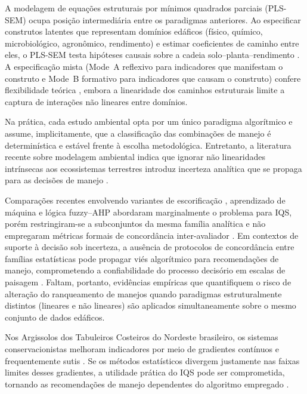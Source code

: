 \documentclass[pdflatex,sn-basic]{sn-jnl}%
\begin{document}
A modelagem de equações estruturais por mínimos quadrados parciais (PLS-SEM) ocupa posição intermediária entre os paradigmas anteriores. Ao especificar construtos latentes que representam domínios edáficos (físico, químico, microbiológico, agronômico, rendimento) e estimar coeficientes de caminho entre eles, o PLS-SEM testa hipóteses causais sobre a cadeia solo--planta--rendimento \citep{Hair2019,Sarstedt2022}. A especificação mista (Mode~A reflexivo para indicadores que manifestam o construto e Mode~B formativo para indicadores que causam o construto) confere flexibilidade teórica \citep{Diamantopoulos2008}, embora a linearidade dos caminhos estruturais limite a captura de interações não lineares entre domínios.

Na prática, cada estudo ambiental opta por um único paradigma algorítmico e assume, implicitamente, que a classificação das combinações de manejo é determinística e estável frente à escolha metodológica. Entretanto, a literatura recente sobre modelagem ambiental indica que ignorar não linearidades intrínsecas aos ecossistemas terrestres introduz incerteza analítica que se propaga para as decisões de manejo \citep{Yoshioka2024,Brito2024,Granata2024}.

Comparações recentes envolvendo variantes de escorificação \citep{Mukherjee2014}, aprendizado de máquina \citep{Zeraatpisheh2020} e lógica fuzzy--AHP \citep{Pacci2026} abordaram marginalmente o problema para IQS, porém restringiram-se a subconjuntos da mesma família analítica e não empregaram métricas formais de concordância inter-avaliador \citep{Venkateswarlu2025,Liu2025}. Em contextos de suporte à decisão sob incerteza, a ausência de protocolos de concordância entre famílias estatísticas pode propagar viés algorítmico para recomendações de manejo, comprometendo a confiabilidade do processo decisório em escalas de paisagem \citep{Angelini2024,Jarvis2023}. Faltam, portanto, evidências empíricas que quantifiquem o risco de alteração do ranqueamento de manejos quando paradigmas estruturalmente distintos (lineares e não lineares) são aplicados simultaneamente sobre o mesmo conjunto de dados edáficos.

Nos Argissolos dos Tabuleiros Costeiros do Nordeste brasileiro, os sistemas conservacionistas melhoram indicadores por meio de gradientes contínuos e frequentemente sutis \citep{Assuncao2023,Oliveira2020}. Se os métodos estatísticos divergem justamente nas faixas limites desses gradientes, a utilidade prática do IQS pode ser comprometida, tornando as recomendações de manejo dependentes do algoritmo empregado \citep{Rezaee2020,Obade2016}.
\end{document}
